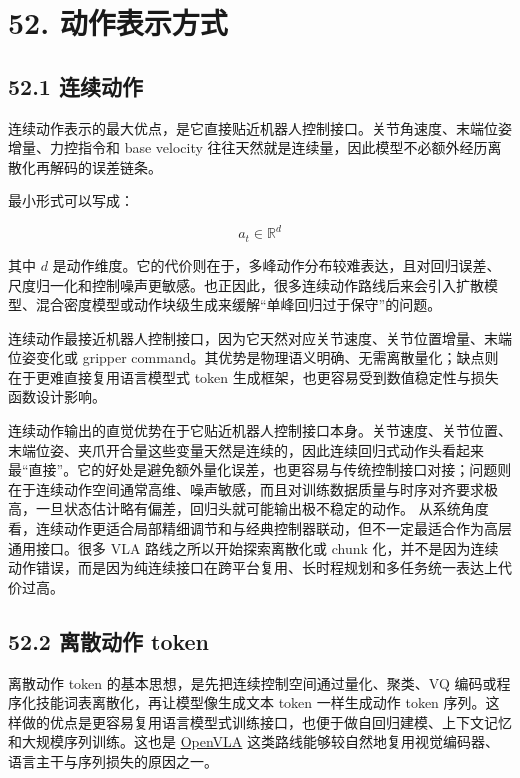 \chapter*{52. 动作表示方式}

\section*{52.1 连续动作}


连续动作表示的最大优点，是它直接贴近机器人控制接口。关节角速度、末端位姿增量、力控指令和 base velocity 往往天然就是连续量，因此模型不必额外经历离散化再解码的误差链条。

最小形式可以写成：

\begin{equation*}
a_t \in \mathbb{R}^d
\end{equation*}

其中 \(d\) 是动作维度。它的代价则在于，多峰动作分布较难表达，且对回归误差、尺度归一化和控制噪声更敏感。也正因此，很多连续动作路线后来会引入扩散模型、混合密度模型或动作块级生成来缓解“单峰回归过于保守”的问题。

连续动作最接近机器人控制接口，因为它天然对应关节速度、关节位置增量、末端位姿变化或 gripper command。其优势是物理语义明确、无需离散量化；缺点则在于更难直接复用语言模型式 token 生成框架，也更容易受到数值稳定性与损失函数设计影响。

连续动作输出的直觉优势在于它贴近机器人控制接口本身。关节速度、关节位置、末端位姿、夹爪开合量这些变量天然是连续的，因此连续回归式动作头看起来最“直接”。它的好处是避免额外量化误差，也更容易与传统控制接口对接；问题则在于连续动作空间通常高维、噪声敏感，而且对训练数据质量与时序对齐要求极高，一旦状态估计略有偏差，回归头就可能输出极不稳定的动作。 从系统角度看，连续动作更适合局部精细调节和与经典控制器联动，但不一定最适合作为高层通用接口。很多 VLA 路线之所以开始探索离散化或 chunk 化，并不是因为连续动作错误，而是因为纯连续接口在跨平台复用、长时程规划和多任务统一表达上代价过高。

\section*{52.2 离散动作 token}


离散动作 token 的基本思想，是先把连续控制空间通过量化、聚类、VQ 编码或程序化技能词表离散化，再让模型像生成文本 token 一样生成动作 token 序列。这样做的优点是更容易复用语言模型式训练接口，也便于做自回归建模、上下文记忆和大规模序列训练。这也是 \href{https://arxiv.org/abs/2406.09246}{OpenVLA} 这类路线能够较自然地复用视觉编码器、语言主干与序列损失的原因之一。

